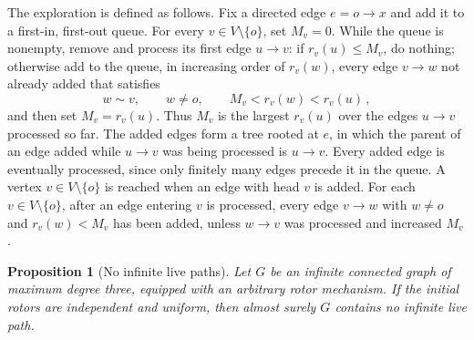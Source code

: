 \documentclass[11pt]{amsart}
\theoremstyle{plain}
\newtheorem{proposition}[theorem]{Proposition}
\theoremstyle{definition}
\begin{document}
	The exploration is defined as follows.  Fix a directed edge $e=o\to x$ and add
	it to a first-in, first-out queue.  For every $v\in V\setminus\{o\}$, set
	$M_v=0$. While the queue is nonempty, remove and process its first edge $u\to v$: if
	$r_v(u)\leq M_v$, do nothing; otherwise add to the queue, in increasing order
	of $r_v(w)$, every edge $v\to w$ not already added that satisfies
	\[
		w\sim v,
		\qquad
		w\ne o,
		\qquad
		M_v<r_v(w)<r_v(u)\, ,
	\]
	and then set $M_v=r_v(u)$.  Thus $M_v$ is the largest $r_v(u)$ over the edges
	$u\to v$ processed so far.  The added edges form a tree rooted at $e$, in which
	the parent of an edge added while $u\to v$ was being processed is $u\to v$.
	Every added edge is eventually processed, since only finitely many edges
	precede it in the queue.  A vertex $v\in V\setminus\{o\}$ is reached when an edge with
	head $v$ is added.  For each $v\in V\setminus\{o\}$, after an edge entering $v$
	is processed, every edge $v\to w$ with $w\ne o$ and $r_v(w)<M_v$ has been
	added, unless $w\to v$ was processed and increased $M_v$.
	
	\begin{proposition}[No infinite live paths]
		\label{prop:subcubic-recurrence}
		Let $G$ be an infinite connected graph of maximum degree three,
		equipped with an arbitrary rotor mechanism.  If the initial rotors are
		independent and uniform, then almost surely $G$ contains no infinite live
		path.
	\end{proposition}
	
\end{document}
